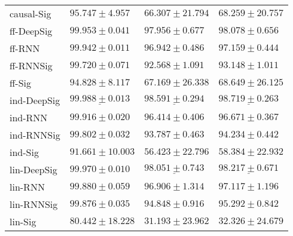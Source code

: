 \begin{tabular}{llll}
causal-Sig     &                           $ 95.747 \pm 4.957 $ &                          $ 66.307 \pm 21.794 $ &                          $ 68.259 \pm 20.757 $ \\
ff-DeepSig     &                           $ 99.953 \pm 0.041 $ &                           $ 97.956 \pm 0.677 $ &                           $ 98.078 \pm 0.656 $ \\
ff-RNN         &                           $ 99.942 \pm 0.011 $ &                           $ 96.942 \pm 0.486 $ &                           $ 97.159 \pm 0.444 $ \\
ff-RNNSig      &                           $ 99.720 \pm 0.071 $ &                           $ 92.568 \pm 1.091 $ &                           $ 93.148 \pm 1.011 $ \\
ff-Sig         &                           $ 94.828 \pm 8.117 $ &                          $ 67.169 \pm 26.338 $ &                          $ 68.649 \pm 26.125 $ \\
ind-DeepSig    &  $  \mathbf{ \underline{ 99.988 \pm 0.013 }} $ &  $  \mathbf{ \underline{ 98.591 \pm 0.294 }} $ &  $  \mathbf{ \underline{ 98.719 \pm 0.263 }} $ \\
ind-RNN        &                           $ 99.916 \pm 0.020 $ &                           $ 96.414 \pm 0.406 $ &                           $ 96.671 \pm 0.367 $ \\
ind-RNNSig     &                           $ 99.802 \pm 0.032 $ &                           $ 93.787 \pm 0.463 $ &                           $ 94.234 \pm 0.442 $ \\
ind-Sig        &                          $ 91.661 \pm 10.003 $ &                          $ 56.423 \pm 22.796 $ &                          $ 58.384 \pm 22.932 $ \\
lin-DeepSig    &                           $ 99.970 \pm 0.010 $ &            $  \underline{ 98.051 \pm 0.743 } $ &            $  \underline{ 98.217 \pm 0.671 } $ \\
lin-RNN        &                           $ 99.880 \pm 0.059 $ &                           $ 96.906 \pm 1.314 $ &                           $ 97.117 \pm 1.196 $ \\
lin-RNNSig     &                           $ 99.876 \pm 0.035 $ &                           $ 94.848 \pm 0.916 $ &                           $ 95.292 \pm 0.842 $ \\
lin-Sig        &                          $ 80.442 \pm 18.228 $ &                          $ 31.193 \pm 23.962 $ &                          $ 32.326 \pm 24.679 $ \\

\end{tabular}
